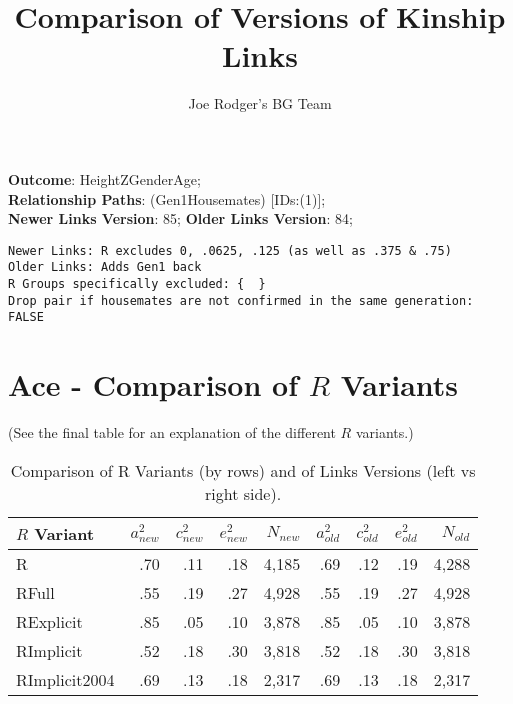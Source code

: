 \documentclass{article}\usepackage[]{graphicx}\usepackage[]{color}
\title{Comparison of Versions of Kinship Links}
\author{Joe Rodger's BG Team}
\makeatletter
\newenvironment{kframe}{%
 \def\at@end@of@kframe{}%
 \ifinner\ifhmode%
  \def\at@end@of@kframe{\end{minipage}}%
  \begin{minipage}{\columnwidth}%
 \fi\fi%
 \def\FrameCommand##1{\hskip\@totalleftmargin \hskip-\fboxsep
 \colorbox{shadecolor}{##1}\hskip-\fboxsep
     \hskip-\linewidth \hskip-\@totalleftmargin \hskip\columnwidth}%
 \MakeFramed {\advance\hsize-\width
   \@totalleftmargin\z@ \linewidth\hsize
   \@setminipage}}%
 {\par\unskip\endMakeFramed%
 \at@end@of@kframe}
\newenvironment{knitrout}{}{} %
\makeatother
\begin{document}
\maketitle
\setcounter{totalnumber}{8} %

\setlength{\parindent}{0pt}%











\textbf{Outcome}: HeightZGenderAge;\\
\textbf{Relationship Paths}: (Gen1Housemates) [IDs:(1)];\\
\textbf{Newer Links Version}: 85;
\textbf{Older Links Version}: 84;

\begin{knitrout}
\color{fgcolor}\begin{kframe}
\begin{verbatim}
Newer Links: R excludes 0, .0625, .125 (as well as .375 & .75)
Older Links: Adds Gen1 back
R Groups specifically excluded: {  }
Drop pair if housemates are not confirmed in the same generation: FALSE
\end{verbatim}
\end{kframe}
\end{knitrout}





\section{Ace - Comparison of $R$ Variants} 
(See the final table for an explanation of the different $R$ variants.)
\begin{table}[ht]
\centering
{\large
\begin{tabular}{l|rrrr|rrrr}
  \hline
$R$ Variant & $a_{new}^2$ & $c_{new}^2$ & $e_{new}^2$ & $N_{new}$ & $a_{old}^2$ & $c_{old}^2$ & $e_{old}^2$ & $N_{old}$ \\ 
  \hline
R & .70 & .11 & .18 & 4,185 & .69 & .12 & .19 & 4,288 \\ 
  RFull & .55 & .19 & .27 & 4,928 & .55 & .19 & .27 & 4,928 \\ 
  RExplicit & .85 & .05 & .10 & 3,878 & .85 & .05 & .10 & 3,878 \\ 
  RImplicit & .52 & .18 & .30 & 3,818 & .52 & .18 & .30 & 3,818 \\ 
  RImplicit2004 & .69 & .13 & .18 & 2,317 & .69 & .13 & .18 & 2,317 \\ 
   \hline
\end{tabular}
}
\caption{Comparison of R Variants (by rows) and of Links Versions (left vs right side).} 
\end{table}
\end{document}
